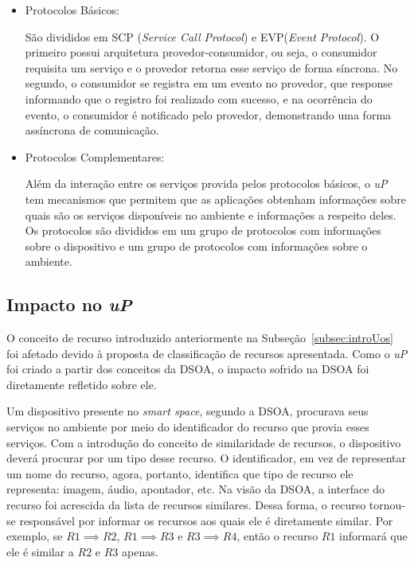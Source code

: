 \begin{itemize}
	\item Protocolos Básicos: 

		São divididos em SCP (\emph{Service Call Protocol}) e EVP(\emph{Event Protocol}). O primeiro possui arquitetura provedor-consumidor, ou seja, o consumidor requisita um serviço e o provedor retorna esse serviço de forma síncrona. No segundo, o consumidor se registra em um evento no provedor, que response informando que o registro foi realizado com sucesso, e na ocorrência do evento, o consumidor é notificado pelo provedor, demonstrando uma forma assíncrona de comunicação.
	\item Protocolos Complementares:

		Além da interação entre os serviços provida pelos protocolos básicos, o \emph{uP} tem mecanismos que permitem que as aplicações obtenham informações sobre quais são os serviços disponíveis no ambiente e informações a respeito deles. Os protocolos são divididos em um grupo de protocolos com informações sobre o dispositivo e um grupo de protocolos com informações sobre o ambiente. 
\end{itemize}

\subsection{Impacto no \emph{uP}}

O conceito de recurso introduzido anteriormente na Subseção~\ref{subsec:introUos} foi afetado devido à proposta de classificação de recursos apresentada. Como o \emph{uP} foi criado a partir dos conceitos da DSOA, o impacto sofrido na DSOA foi diretamente refletido sobre ele.

Um dispositivo presente no \emph{smart space}, segundo a DSOA, procurava seus serviços no ambiente por meio do identificador do recurso que provia esses serviços. Com a introdução do conceito de similaridade de recursos, o dispositivo deverá procurar por um tipo desse recurso. O identificador, em vez de representar um nome do recurso, agora, portanto, identifica que tipo de recurso ele representa: imagem, áudio, apontador, etc. Na visão da DSOA, a interface do recurso foi acrescida da lista de recursos similares. Dessa forma, o recurso tornou-se responsável por informar os recursos aos quais ele é diretamente similar. Por exemplo, se $R1 \implies R2$, $R1 \implies R3$ e $R3 \implies R4$, então o recurso $R1$ informará que ele é similar a $R2$ e $R3$ apenas.

